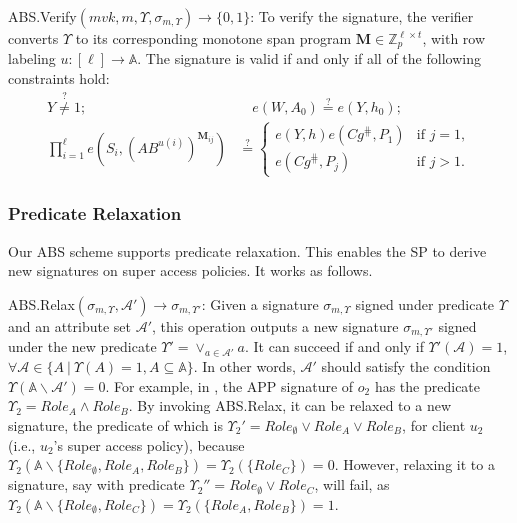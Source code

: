 \textsf{ABS.Verify}$(mvk, m, \Upsilon, \sigma_{m, \Upsilon}) \to \{0,1\}$:
To verify the signature, the verifier converts $\Upsilon$ to its corresponding monotone span program $\mathbf{M} \in \mathbb{Z}_p^{\ell \times t}$, with row labeling $u: [\ell] \to \mathbb{A}$. The signature is valid if and only if all of the following constraints hold:
\begin{align*}
  Y         \stackrel{?}{\neq} 1; \quad & \quad e(W,A_0)  \stackrel{?}{=} e(Y,h_0); \\
  \prod_{i=1}^\ell e \left( S_i, {(A B^{u(i)})}^{\mathbf{M}_{ij}}\right)
                                        & \stackrel{?}{=}  \left\{
                                          \begin{array}{ll}
                                            e(Y,h)e(Cg^{\hash},P_1)             & \text{if } j = 1,                        \\
                                            e(Cg^{\hash},P_j)                   & \text{if } j > 1.
                                        \end{array} \right.
\end{align*}

\subsubsection{Predicate Relaxation}\label{sec:access-control:abs-relax}

Our ABS scheme supports predicate relaxation. This enables the SP to derive new signatures on super access policies. It works as follows.

\textsf{ABS.Relax}$(\sigma_{m,\Upsilon}, \mathcal{A}') \to \sigma_{m,\Upsilon'}$:
Given a signature $\sigma_{m,\Upsilon}$ signed under predicate $\Upsilon$ and an attribute set $\mathcal{A}'$, this operation outputs a new signature $\sigma_{m,\Upsilon'}$ signed under the new predicate $\Upsilon' = \lor_{a \in \mathcal{A}'} a$. It can succeed if and only if $\Upsilon'(\mathcal{A}) = 1$, $\forall \mathcal{A} \in \{ A~|~\Upsilon(A) = 1, A \subseteq \mathbb{A} \}$. In other words, $\mathcal{A}'$ should satisfy the condition $\Upsilon(\mathbb{A}\backslash\mathcal{A}') = 0$.
For example, in , the APP signature of $o_2$ has the predicate $\Upsilon_2 = {Role}_{A} \land {Role}_{B}$. By invoking \textsf{ABS.Relax}, it can be relaxed to a new signature, the predicate of which is $\Upsilon_2' = {Role}_{\emptyset} \lor {Role}_{A} \lor {Role}_{B}$, for client $u_2$ (i.e., $u_2$'s super access policy), because $\Upsilon_2(\mathbb{A}\backslash \{{Role}_{\emptyset}, {Role}_A, {Role}_B\}) = \Upsilon_2(\{{Role}_C\}) = 0$. However, relaxing it to a signature, say with predicate $\Upsilon_2'' = {Role}_{\emptyset} \lor {Role}_{C}$, will fail, as $\Upsilon_2(\mathbb{A}\backslash \{{Role}_{\emptyset}, {Role}_C\}) = \Upsilon_2(\{{Role}_A, {Role}_B\}) = 1$.

